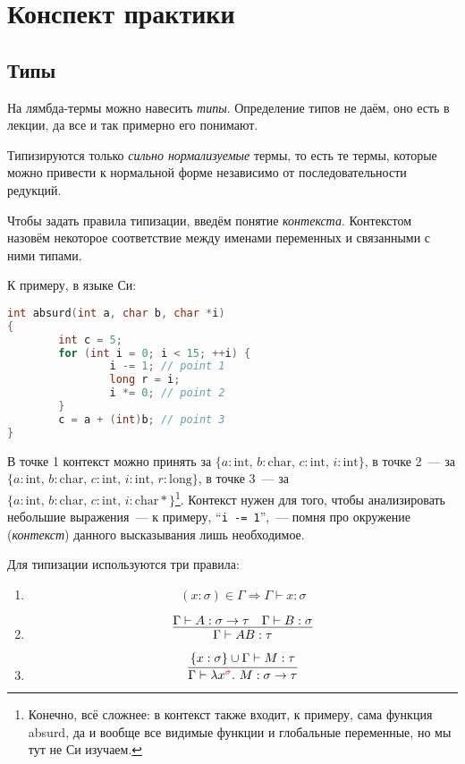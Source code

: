 \documentclass[12pt, a4paper] {article}
\begin{document}
\frenchspacing
\pagestyle{empty}

\section{Конспект практики}

\subsection{Типы}

На лямбда-термы можно навесить \emph{типы}. Определение типов не даём, оно есть
в лекции, да все и так примерно его понимают.

Типизируются только \emph{сильно нормализуемые} термы, то есть те термы, которые
можно привести к нормальной форме независимо от последовательности редукций.

Чтобы задать правила типизации, введём понятие \emph{контекста}. Контекстом
назовём некоторое соответствие между именами переменных и связанными с ними
типами.

К примеру, в языке Си:

\begin{lstlisting}[language=C,basicstyle=\small]
int absurd(int a, char b, char *i)
{
        int c = 5;
        for (int i = 0; i < 15; ++i) {
                i -= 1; // point 1
                long r = i;
                i *= 0; // point 2
        }
        c = a + (int)b; // point 3
}
\end{lstlisting}

В точке 1 контекст можно принять за $\{a : \mathrm{int},\, b : \mathrm{char},\,
c : \mathrm{int},\, i : \mathrm{int}\}$, в точке 2~--- за $\{a : \mathrm{int},\,
b : \mathrm{char},\, c : \mathrm{int},\,  i : \mathrm{int},\, r :
\mathrm{long}\}$, в точке 3~--- за $\{a : \mathrm{int},\, b : \mathrm{char},\, c
: \mathrm{int},\, i : \mathrm{char *}\}$\footnote{Конечно, всё сложнее: в
контекст также входит, к примеру, сама функция absurd, да и вообще все видимые
функции и глобальные переменные, но мы тут не Си изучаем.}.
Контекст нужен для того, чтобы анализировать небольшие выражения~--- к примеру,
``\texttt{i -= 1}'',~--- помня про окружение (\emph{контекст}) данного
высказывания лишь необходимое.

Для типизации используются три правила:

\begin{enumerate}
  \item $$(x: \sigma) \in \Gamma \Longrightarrow \Gamma \vdash x: \sigma$$
  \item $$\infer{\Gamma \vdash A B : \tau}
                {\Gamma \vdash A : \sigma \to \tau & \Gamma \vdash B : \sigma}$$
  \item $$\infer{\Gamma \vdash \lambda x^{\color{red} \sigma}.~M : \sigma \to \tau}
                {\{x : \sigma\} \cup \Gamma \vdash M : \tau}$$
\end{enumerate}
\end{document}
